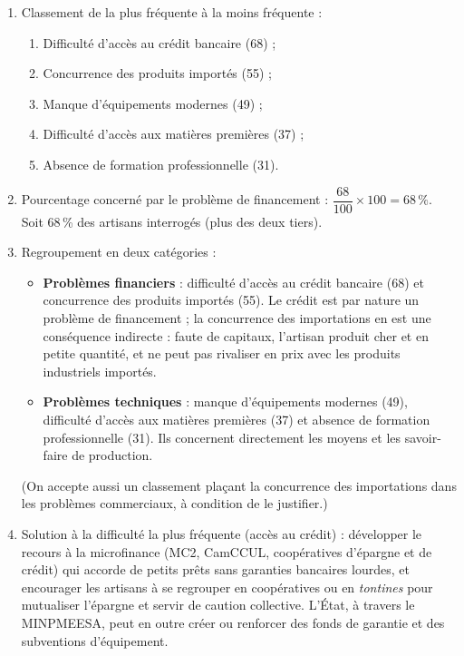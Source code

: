 \documentclass[11pt]{article}
\newcommand{\cle}[1]{{\popxbold\color{popdark}#1}}
\begin{document}
\begin{corrige}
\begin{enumerate}
\item Classement de la plus fréquente à la moins fréquente :
\begin{enumerate}
\item Difficulté d'accès au crédit bancaire (68) ;
\item Concurrence des produits importés (55) ;
\item Manque d'équipements modernes (49) ;
\item Difficulté d'accès aux matières premières (37) ;
\item Absence de formation professionnelle (31).
\end{enumerate}
\item Pourcentage concerné par le problème de financement : $\dfrac{68}{100} \times 100 = 68\,\%$. Soit 68\,\% des artisans interrogés (plus des deux tiers).
\item Regroupement en deux catégories :
\begin{itemize}
\item \textbf{Problèmes financiers} : difficulté d'accès au crédit bancaire (68) et concurrence des produits importés (55). Le crédit est par nature un problème de financement ; la concurrence des importations en est une conséquence indirecte : faute de capitaux, l'artisan produit cher et en petite quantité, et ne peut pas rivaliser en prix avec les produits industriels importés.
\item \textbf{Problèmes techniques} : manque d'équipements modernes (49), difficulté d'accès aux matières premières (37) et absence de formation professionnelle (31). Ils concernent directement les moyens et les savoir-faire de production.
\end{itemize}
(On accepte aussi un classement plaçant la concurrence des importations dans les problèmes commerciaux, à condition de le justifier.)
\item Solution à la difficulté la plus fréquente (accès au crédit) : développer le recours à la \cle{microfinance} (MC2, CamCCUL, coopératives d'épargne et de crédit) qui accorde de petits prêts sans garanties bancaires lourdes, et encourager les artisans à se regrouper en coopératives ou en \emph{tontines} pour mutualiser l'épargne et servir de caution collective. L'État, à travers le MINPMEESA, peut en outre créer ou renforcer des fonds de garantie et des subventions d'équipement.
\end{enumerate}
\end{corrige}
\end{document}
